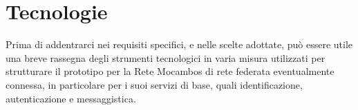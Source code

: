 




\section{Tecnologie}
Prima di addentrarci nei requisiti specifici, e nelle scelte adottate,
può essere utile una breve rassegna degli strumenti tecnologici in
varia misura utilizzati per strutturare il prototipo per la Rete
Mocambos di rete federata eventualmente connessa, in particolare per i
suoi servizi di base, quali identificazione, autenticazione e
messaggistica.

